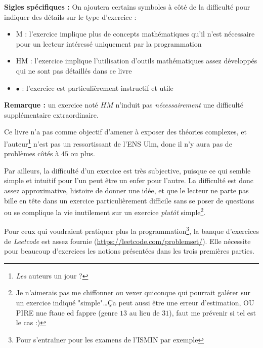 \documentclass[../main.tex]{subfiles}
\begin{document}
\textbf{Sigles spécifiques :} On ajoutera certains symboles à côté de la difficulté pour indiquer des détails sur le type d'exercice :
\begin{itemize}
	\item M : l'exercice implique plus de concepts mathématiques qu'il n'est nécessaire pour un lecteur intéressé uniquement par la programmation
	\item HM : l'exercice implique l'utilisation d'outils mathématiques assez développés qui ne sont pas détaillés dans ce livre
	\item $\bullet$ : l'exercice est particulièrement instructif et utile
\end{itemize}
\textbf{Remarque :} un exercice noté $HM$ n'induit pas \textit{nécessairement} une difficulté supplémentaire extraordinaire.

Ce livre n'a pas comme objectif d'amener à exposer des théories complexes, et l'auteur\footnote{\textit{Les} auteurs un jour ?} n'est pas un ressortissant de l'ENS Ulm, donc il n'y aura pas de problèmes côtés à $45$ ou plus.

Par ailleurs, la difficulté d'un exercice est très subjective, puisque ce qui semble simple et intuitif pour l'un peut être un enfer pour l'autre. La difficulté est donc assez approximative, histoire de donner une idée, et que le lecteur ne parte pas bille en tête dans un exercice particulièrement difficile sans se poser de questions ou se complique la vie inutilement sur un exercice \textit{plutôt} simple\footnote{Je n'aimerais pas me chiffonner ou vexer quiconque qui pourrait galérer sur un exercice indiqué "simple"\dots Ça peut aussi être une erreur d'estimation, OU PIRE nue ftaue ed fappre (genre $13$ au lieu de $31$), faut me prévenir si tel est le cas :)}.

Pour ceux qui voudraient pratiquer plus la programmation\footnote{Pour s'entraîner pour les examens de l'ISMIN par exemple}, la banque d'exercices de \textit{Leetcode} est assez fournie (\url{https://leetcode.com/problemset/}). Elle nécessite pour beaucoup d'exercices les notions présentées dans les trois premières parties.
\newpage
\end{document}
